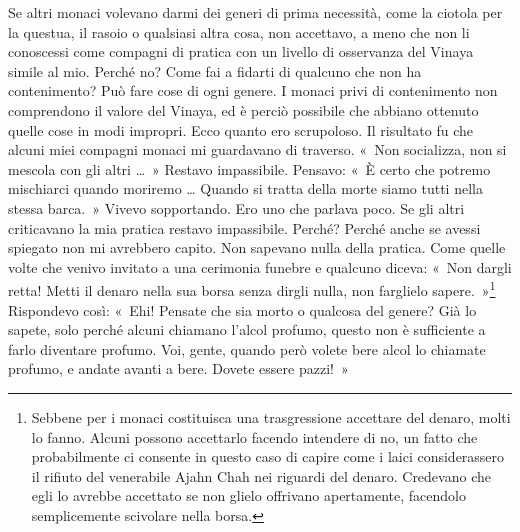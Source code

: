 Se altri monaci volevano darmi dei generi di prima necessità, come la
ciotola per la questua, il rasoio o qualsiasi altra cosa, non accettavo,
a meno che non li conoscessi come compagni di pratica con un livello di
osservanza del Vinaya simile al mio. Perché no? Come fai a fidarti di
qualcuno che non ha contenimento? Può fare cose di ogni genere. I monaci
privi di contenimento non comprendono il valore del Vinaya, ed è perciò
possibile che abbiano ottenuto quelle cose in modi impropri. Ecco quanto
ero scrupoloso. Il risultato fu che alcuni miei compagni monaci mi
guardavano di traverso. «~Non socializza, non si mescola con gli altri
\ldots{}~» Restavo impassibile. Pensavo: «~È certo che potremo mischiarci
quando moriremo \ldots{} Quando si tratta della morte siamo tutti nella
stessa barca.~» Vivevo sopportando. Ero uno che parlava poco. Se gli
altri criticavano la mia pratica restavo impassibile. Perché? Perché
anche se avessi spiegato non mi avrebbero capito. Non sapevano nulla
della pratica. Come quelle volte che venivo invitato a una cerimonia
funebre e qualcuno diceva: «~Non dargli retta! Metti il denaro nella sua
borsa senza dirgli nulla, non farglielo sapere.~»\footnote{Sebbene per i
  monaci costituisca una trasgressione accettare del denaro, molti lo
  fanno. Alcuni possono accettarlo facendo intendere di no, un fatto che
  probabilmente ci consente in questo caso di capire come i laici
  considerassero il rifiuto del venerabile Ajahn Chah nei riguardi del
  denaro. Credevano che egli lo avrebbe accettato se non glielo
  offrivano apertamente, facendolo semplicemente scivolare nella borsa.}
Rispondevo così: «~Ehi! Pensate che sia morto o qualcosa del genere? Già
lo sapete, solo perché alcuni chiamano l'alcol profumo, questo non è
sufficiente a farlo diventare profumo. Voi, gente, quando però volete
bere alcol lo chiamate profumo, e andate avanti a bere. Dovete essere
pazzi!~»


